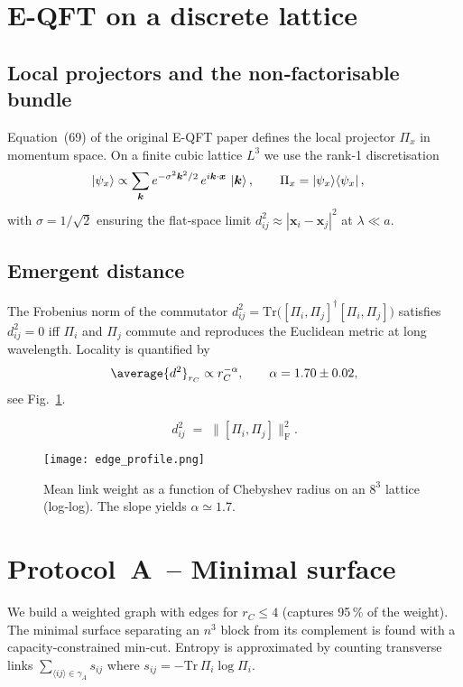\documentclass[aps,prd,onecolumn,nofootinbib,superscriptaddress]{revtex4-2}
\newcommand{\Tr}{\mathrm{Tr}}
\newcommand{\boxedeq}[2]{%
  \begin{tcolorbox}[title={#1},sharp corners,enhanced]
  \[
    #2
  \]
  \end{tcolorbox}}
\begin{document}
\section{E-QFT on a discrete lattice}
\label{sec:theory}

\subsection{Local projectors and the non‑factorisable bundle}

Equation (69) of the original E-QFT paper defines the local projector
$\Pi_x$ in momentum space.  On a finite cubic lattice
$L^{3}$ we use the rank‑1 discretisation
\begin{align}
\ket{\psi_x} &\propto \sum_{\bm k}
    e^{-\sigma^{2}\bm k^{2}/2}\,
    e^{i\bm k\cdot\bm x}\,\ket{\bm k}, \qquad
\Pi_x = \ket{\psi_x}\!\bra{\psi_x},
\end{align}
with $\sigma=1/\sqrt 2$ ensuring the flat‑space limit
$d_{ij}^{2}\approx|\bm x_i-\bm x_j|^{2}$ at $\lambda\!\ll\!a$.

\subsection{Emergent distance}
The Frobenius norm of the commutator
\(
d_{ij}^{2}=\Tr\bigl([\Pi_i,\Pi_j]^\dagger[\Pi_i,\Pi_j]\bigr)
\)
satisfies $d_{ij}^{2}=0$ iff $\Pi_i$ and $\Pi_j$ commute and reproduces
the Euclidean metric at long wavelength.  Locality is quantified by
\[
\average{d^{2}}_{r_C}\propto r_C^{-\alpha},
\qquad
\alpha=1.70\pm0.02,
\]
see Fig.~\ref{fig:edge_profile}.

\boxedeq{Commutator metric}{
  d_{ij}^{2} \;=\;
  \bigl\|[\Pi_i,\Pi_j]\bigr\|_{\mathrm F}^{2}.
}

\begin{figure}[t]
    \centering
    \texttt{[image: edge\_profile.png]}
    \caption{Mean link weight as a function of Chebyshev radius on an
    $8^{3}$ lattice (log‑log).  The slope yields
    $\alpha\simeq1.7$.}
    \label{fig:edge_profile}
\end{figure}

\section{Protocol A – Minimal surface}
\label{sec:protocolA}

We build a weighted graph with edges for $r_C\le4$ (captures 95\,\% of
the weight).  The minimal surface separating an $n^{3}$ block from its
complement is found with a capacity‑constrained min‑cut.  Entropy is
approximated by counting transverse links
\(\sum_{\langle ij\rangle\in\gamma_A}s_{ij}\) where
$s_{ij}= -\Tr\,\Pi_i\log\Pi_i$.
\end{document}
